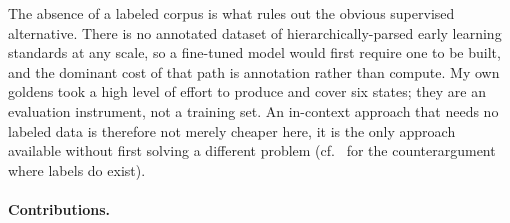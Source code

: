 The absence of a labeled corpus is what rules out the obvious supervised
alternative. There is no annotated dataset of hierarchically-parsed early
learning standards at any scale, so a fine-tuned model would first require one
to be built, and the dominant cost of that path is annotation rather than
compute. My own goldens took a high level of effort to produce and cover six states;
they are an evaluation instrument, not a training set. An in-context approach
that needs no labeled data is therefore not merely cheaper here, it is the only
approach available without first solving a different problem
(cf.~\citealp{liu2022fewshot} for the counterargument where labels do exist).

\paragraph{Contributions.}
